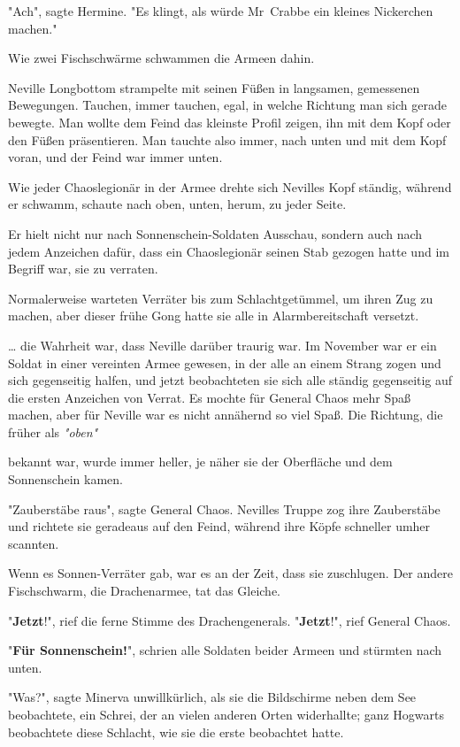 {"Ach", sagte Hermine. "Es klingt, als würde Mr~Crabbe ein kleines Nickerchen machen."

Wie zwei Fischschwärme schwammen die Armeen dahin.

Neville Longbottom strampelte mit seinen Füßen in langsamen, gemessenen Bewegungen. Tauchen, immer tauchen, egal, in welche Richtung man sich gerade bewegte. Man wollte dem Feind das kleinste Profil zeigen, ihn mit dem Kopf oder den Füßen präsentieren. Man tauchte also immer, nach unten und mit dem Kopf voran, und der Feind war immer unten.

Wie jeder Chaoslegionär in der Armee drehte sich Nevilles Kopf ständig, während er schwamm, schaute nach oben, unten, herum, zu jeder Seite.

Er hielt nicht nur nach Sonnenschein-Soldaten Ausschau, sondern auch nach jedem Anzeichen dafür, dass ein Chaoslegionär seinen Stab gezogen hatte und im Begriff war, sie zu verraten.

Normalerweise warteten Verräter bis zum Schlachtgetümmel, um ihren Zug zu machen, aber dieser frühe Gong hatte sie alle in Alarmbereitschaft versetzt.

… die Wahrheit war, dass Neville darüber traurig war. Im November war er ein Soldat in einer vereinten Armee gewesen, in der alle an einem Strang zogen und sich gegenseitig halfen, und jetzt beobachteten sie sich alle ständig gegenseitig auf die ersten Anzeichen von Verrat. Es mochte für General Chaos mehr Spaß machen, aber für Neville war es nicht annähernd so viel Spaß. Die Richtung, die früher als \emph{"oben"}

bekannt war, wurde immer heller, je näher sie der Oberfläche und dem Sonnenschein kamen.

"Zauberstäbe raus", sagte General Chaos. Nevilles Truppe zog ihre Zauberstäbe und richtete sie geradeaus auf den Feind, während ihre Köpfe schneller umher scannten.

Wenn es Sonnen-Verräter gab, war es an der Zeit, dass sie zuschlugen. Der andere Fischschwarm, die Drachenarmee, tat das Gleiche.

"\textbf{Jetzt}!", rief die ferne Stimme des Drachengenerals. "\textbf{Jetzt}!", rief General Chaos.

"\textbf{Für Sonnenschein!}", schrien alle Soldaten beider Armeen und stürmten nach unten.

"Was?", sagte Minerva unwillkürlich, als sie die Bildschirme neben dem See beobachtete, ein Schrei, der an vielen anderen Orten widerhallte; ganz Hogwarts beobachtete diese Schlacht, wie sie die erste beobachtet hatte.

}
